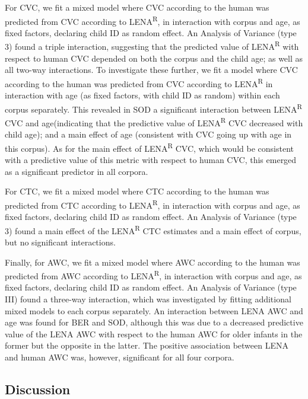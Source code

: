 \documentclass[english,table,man,floatsintext]{apa6}
\begin{document}
For CVC, we fit a mixed model where CVC according to the human was predicted from CVC according to LENA\textsuperscript{R}, in interaction with corpus and age, as fixed factors, declaring child ID as random effect. An Analysis of Variance (type 3) found a triple interaction, suggesting that the predicted value of LENA\textsuperscript{R} with respect to human CVC depended on both the corpus and the child age; as well as all two-way interactions. To investigate these further, we fit a model where CVC according to the human was predicted from CVC according to LENA\textsuperscript{R} in interaction with age (as fixed factors, with child ID as random) within each corpus separately. This revealed in SOD a significant interaction between LENA\textsuperscript{R} CVC and age(indicating that the predictive value of LENA\textsuperscript{R} CVC decreased with child age); and a main effect of age (consistent with CVC going up with age in this corpus). As for the main effect of LENA\textsuperscript{R} CVC, which would be consistent with a predictive value of this metric with respect to human CVC, this emerged as a significant predictor in all corpora.

For CTC, we fit a mixed model where CTC according to the human was predicted from CTC according to LENA\textsuperscript{R}, in interaction with corpus and age, as fixed factors, declaring child ID as random effect. An Analysis of Variance (type 3) found a main effect of the LENA\textsuperscript{R} CTC estimates and a main effect of corpus, but no significant interactions.

Finally, for AWC, we fit a mixed model where AWC according to the human was predicted from AWC according to LENA\textsuperscript{R}, in interaction with corpus and age, as fixed factors, declaring child ID as random effect. An Analysis of Variance (type III) found a three-way interaction, which was investigated by fitting additional mixed models to each corpus separately. An interaction between LENA AWC and age was found for BER and SOD, although this was due to a decreased predictive value of the LENA AWC with respect to the human AWC for older infants in the former but the opposite in the latter. The positive association between LENA and human AWC was, however, significant for all four corpora.

\hypertarget{discussion}{%
\subsection{Discussion}\label{discussion}}
\end{document}
